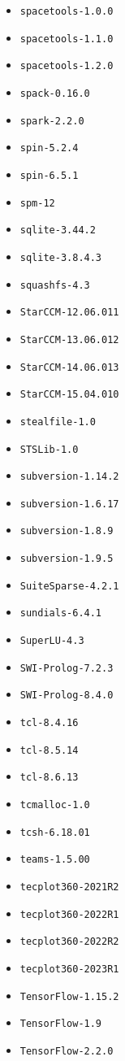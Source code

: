 \begin{multicols}{3}
\begin{itemize}
\item \verb|spacetools-1.0.0|
\item \verb|spacetools-1.1.0|
\item \verb|spacetools-1.2.0|
\item \verb|spack-0.16.0|
\item \verb|spark-2.2.0|
\item \verb|spin-5.2.4|
\item \verb|spin-6.5.1|
\item \verb|spm-12|
\item \verb|sqlite-3.44.2|
\item \verb|sqlite-3.8.4.3|
\item \verb|squashfs-4.3|
\item \verb|StarCCM-12.06.011|
\item \verb|StarCCM-13.06.012|
\item \verb|StarCCM-14.06.013|
\item \verb|StarCCM-15.04.010|
\item \verb|stealfile-1.0|
\item \verb|STSLib-1.0|
\item \verb|subversion-1.14.2|
\item \verb|subversion-1.6.17|
\item \verb|subversion-1.8.9|
\item \verb|subversion-1.9.5|
\item \verb|SuiteSparse-4.2.1|
\item \verb|sundials-6.4.1|
\item \verb|SuperLU-4.3|
\item \verb|SWI-Prolog-7.2.3|
\item \verb|SWI-Prolog-8.4.0|
\item \verb|tcl-8.4.16|
\item \verb|tcl-8.5.14|
\item \verb|tcl-8.6.13|
\item \verb|tcmalloc-1.0|
\item \verb|tcsh-6.18.01|
\item \verb|teams-1.5.00|
\item \verb|tecplot360-2021R2|
\item \verb|tecplot360-2022R1|
\item \verb|tecplot360-2022R2|
\item \verb|tecplot360-2023R1|
\item \verb|TensorFlow-1.15.2|
\item \verb|TensorFlow-1.9|
\item \verb|TensorFlow-2.2.0|

\end{itemize}
\end{multicols}
